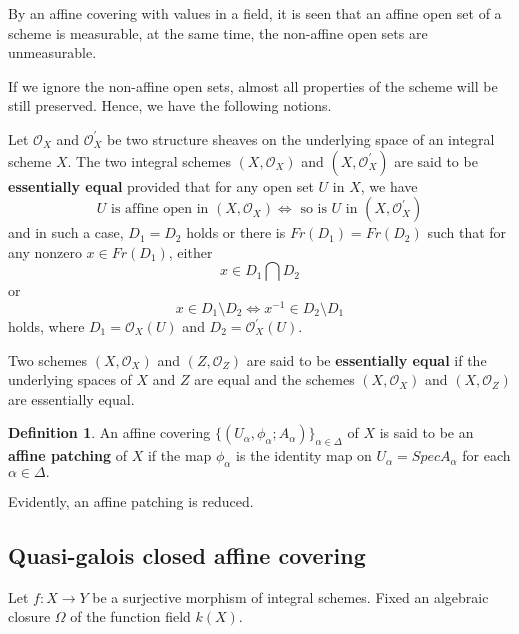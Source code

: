 \documentclass[12pt,twoside,reqno]{amsart}
\theoremstyle{definition}
\newtheorem{definition}[theorem]{Definition}
\numberwithin{equation}{section}
\begin{document}
By an affine covering with values in a field, it is seen that an affine open set of a scheme is measurable, at the same time, the non-affine open sets are unmeasurable.

If we ignore the non-affine open sets, almost all properties of the scheme will be still preserved. Hence, we have the following notions.

Let $\mathcal{O}_{X}$ and $\mathcal{O}^{\prime}_{X}$ be two structure sheaves on the underlying space of an integral scheme $X$. The two integral schemes $(X,\mathcal{O}_{X})$ and $(X, \mathcal{O}^{\prime}_{X})$ are said to be \textbf{essentially equal} provided that for any open set $U$ in $X$, we have
 $$U \text{ is affine open in }(X,\mathcal{O}_{X}) \Longleftrightarrow \text{ so is }U \text{ in }(X,\mathcal{O}^{\prime}_{X})$$ and in such a case,  $D_{1}=D_{2}$ holds or  there is $Fr(D_{1})=Fr(D_{2})$ such that for any nonzero $x\in Fr(D_{1})$, either $$x\in D_{1}\bigcap D_{2}$$ or $$x\in D_{1}\setminus D_{2} \Longleftrightarrow x^{-1}\in D_{2}\setminus D_{1}$$ holds, where $D_{1}=\mathcal{O}_{X} (U)$ and $D_{2}=\mathcal{O}^{\prime}_{X} (U)$.


 Two schemes $(X,\mathcal{O}_{X})$ and $(Z,\mathcal{O}_{Z})$ are said to be \textbf{essentially equal} if the underlying spaces of $X$ and $Z$ are equal and the schemes $(X,\mathcal{O}_{X})$ and $(X,\mathcal{O}_{Z})$ are essentially equal.

\begin{definition}
An affine covering $\{(U_{\alpha },\phi _{\alpha };A_{\alpha })\}_{\alpha
\in \Delta }$ of $X$ is said to be an \textbf{affine
patching} of $X$ if the map $\phi _{\alpha }$ is the
identity map on $U_{\alpha }=SpecA_{\alpha }$ for each $\alpha \in \Delta .$
\end{definition}


Evidently, an affine patching is reduced.

\subsection{Quasi-galois closed affine covering}


Let $f:X\rightarrow Y$ be a
surjective morphism of integral schemes. Fixed an algebraic closure $\Omega$ of the function field $k(X)$.
\end{document}
